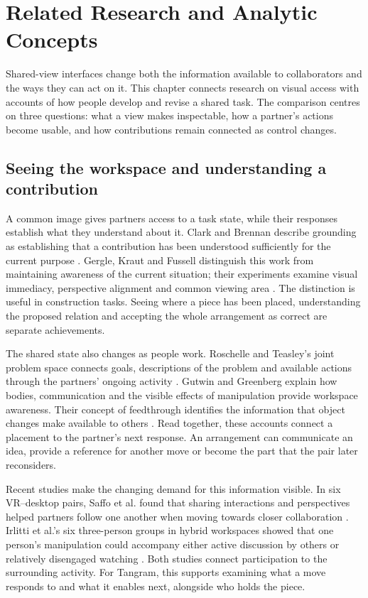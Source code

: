 \chapter{Related Research and Analytic Concepts}\label{chap:2}

Shared-view interfaces change both the information available to collaborators and the ways they can act on it. This chapter connects research on visual access with accounts of how people develop and revise a shared task. The comparison centres on three questions: what a view makes inspectable, how a partner's actions become usable, and how contributions remain connected as control changes.

\section{Seeing the workspace and understanding a contribution}\label{sec:2-1}

A common image gives partners access to a task state, while their responses establish what they understand about it. Clark and Brennan describe grounding as establishing that a contribution has been understood sufficiently for the current purpose \cite{clark1991}. Gergle, Kraut and Fussell distinguish this work from maintaining awareness of the current situation; their experiments examine visual immediacy, perspective alignment and common viewing area \cite{gergle2013}. The distinction is useful in construction tasks. Seeing where a piece has been placed, understanding the proposed relation and accepting the whole arrangement as correct are separate achievements.

The shared state also changes as people work. Roschelle and Teasley's joint problem space connects goals, descriptions of the problem and available actions through the partners' ongoing activity \cite{roschelle1995}. Gutwin and Greenberg explain how bodies, communication and the visible effects of manipulation provide workspace awareness. Their concept of feedthrough identifies the information that object changes make available to others \cite{gutwin2002}. Read together, these accounts connect a placement to the partner's next response. An arrangement can communicate an idea, provide a reference for another move or become the part that the pair later reconsiders.

Recent studies make the changing demand for this information visible. In six VR--desktop pairs, Saffo et al. found that sharing interactions and perspectives helped partners follow one another when moving towards closer collaboration \cite{saffo2023}. Irlitti et al.'s six three-person groups in hybrid workspaces showed that one person's manipulation could accompany either active discussion by others or relatively disengaged watching \cite{irlitti2024}. Both studies connect participation to the surrounding activity. For Tangram, this supports examining what a move responds to and what it enables next, alongside who holds the piece.

